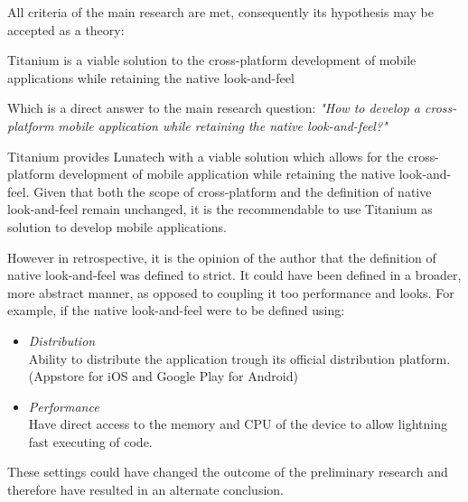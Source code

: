 \noindent All criteria of the main research are met, consequently its hypothesis may be accepted as a theory:

\begin{shadequote}
Titanium is a viable solution to the cross-platform development of mobile applications while retaining the native look-and-feel%
\end{shadequote}

\noindent Which is a direct answer to the main research question: \emph{"How to develop a cross-platform mobile application while retaining the native look-and-feel?"}

%
%
Titanium provides Lunatech with a viable solution which allows for the cross-platform development of mobile application while retaining the native look-and-feel. Given that both the scope of cross-platform and the definition of native look-and-feel remain unchanged, it is the recommendable to use Titanium as solution to develop mobile applications.

However in retrospective, it is the opinion of the author that the definition of native look-and-feel was defined to strict. It could have been defined in a broader, more abstract manner, as opposed to coupling it too performance and looks. For example, if the native look-and-feel were to be defined using: 
\begin{itemize}
\item \emph{Distribution}\\
Ability to distribute the application trough its official distribution platform. (Appstore for iOS and Google Play for Android)
\item \emph{Performance}\\
Have direct access to the memory and CPU of the device to allow lightning fast executing of code.
\end{itemize}
\noindent These settings could have changed the outcome of the preliminary research and therefore have resulted in an alternate conclusion.